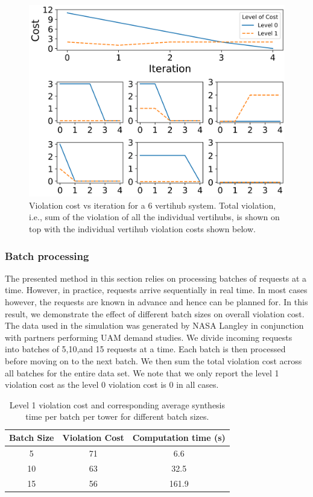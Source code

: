 \begin{figure}[h!]
    \centering
    \includegraphics[width=0.85\columnwidth]{UAM-NFM/Figures/cost_vs_iteration_compiled.png}
    \caption{Violation cost vs iteration for a 6 vertihub system. Total violation, i.e., sum of the violation of all the individual vertihubs, is shown on top with the individual vertihub violation costs shown below.}
    \label{fig:costreduction}
\end{figure}



\subsubsection{Batch processing} The presented method in this section relies on processing batches of requests at a time. However, in practice, requests arrive sequentially in real time. In most cases however, the requests are known in advance and hence can be planned for. In this result, we demonstrate the effect of different batch sizes on overall violation cost. The data used in the simulation was generated by NASA Langley in conjunction with partners performing UAM demand studies. We divide incoming requests into batches of 5,10,and 15 requests at a time. Each batch is then processed before moving on to the next batch. We then sum the total violation cost across all batches for the entire data set. We note that we only report the level 1 violation cost as the level 0 violation cost is 0 in all cases. 

\begin{table}[]
\centering
\begin{tabular}{|c|c|c|} \toprule
Batch Size  & Violation Cost & Computation time (s) \\ \midrule
      5     &     71           &      6.6            \\
      10     &     63           &     32.5            \\
      15     &     56           &     161.9         \\ \bottomrule   
\end{tabular}
\caption{Level 1 violation cost and corresponding average synthesis time per batch per tower for different batch sizes.  } \label{tab:batchsizes}
\end{table}


